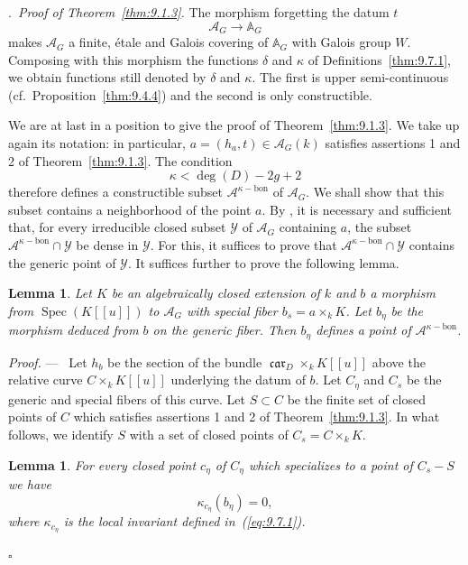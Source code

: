 \documentclass[12pt,a4paper,oneside,english,leqno]{smfart}
\makeatletter
\numberwithin{equation}{subsection}
\newcounter{theo}
\numberwithin{theo}{subsection}
\newenvironment{paragr}[1][]{\medskip\refstepcounter{subsection}%
  \par\noindent\hspace*{\parindent}\thesubsection.\ \emph{#1}%
  \@ifundefined{@empty}{}{}\ignorespaces}{\medskip}
\theoremstyle{plain}
\newtheorem{lemma}[theo]{Lemma}
\theoremstyle{definition}
\theoremstyle{remark}
\newenvironment{preuve}[1][]{\medskip\noindent\textit{Proof.} #1 ---\ }%
  {\hfill\ensuremath{\square}\medskip}
\DeclareMathOperator{\Spec}{Spec}
\DeclareMathOperator{\car}{\mathfrak{car}}
\newcommand{\AAA}{\mathbb{A}}
\newcommand{\yc}{\mathcal{Y}}
\newcommand{\Ac}{\mathcal{A}}
\makeatother
\begin{document}
\begin{paragr}[Proof of Theorem~\protect\ref{thm:9.1.3}.]\label{S:9.15}
The morphism forgetting the datum $t$
$$\Ac_G\to\AAA_G$$
makes $\Ac_G$ a finite, \'etale and Galois covering of $\AAA_G$ with Galois group $W$. Composing with this morphism the functions $\delta$ and $\kappa$ of Definitions~\ref{thm:9.7.1}, we obtain functions still denoted by $\delta$ and $\kappa$. The first is upper semi-continuous (cf.\ Proposition~\ref{thm:9.4.4}) and the second is only constructible.

We are at last in a position to give the proof of Theorem~\ref{thm:9.1.3}. We take up again its notation: in particular, $a=(h_a,t)\in\Ac_G(k)$ satisfies assertions 1 and 2 of Theorem~\ref{thm:9.1.3}. The condition
$$\kappa<\deg(D)-2g+2$$
therefore defines a constructible subset $\Ac^{\kappa-\mathrm{bon}}$ of $\Ac_G$. We shall show that this subset contains a neighborhood of the point $a$. By \cite[Chap.~0, Prop.~9.2.5]{EGAIII}, it is necessary and sufficient that, for every irreducible closed subset $\yc$ of $\Ac_G$ containing $a$, the subset $\Ac^{\kappa-\mathrm{bon}}\cap\yc$ be dense in $\yc$. For this, it suffices to prove that $\Ac^{\kappa-\mathrm{bon}}\cap\yc$ contains the generic point of $\yc$. It suffices further to prove the following lemma.

\begin{lemma}\label{thm:9.15.1}
Let $K$ be an algebraically closed extension of $k$ and $b$ a morphism from $\Spec(K[[u]])$ to $\Ac_G$ with special fiber $b_s=a\times_kK$. Let $b_\eta$ be the morphism deduced from $b$ on the generic fiber. Then $b_\eta$ defines a point of $\Ac^{\kappa-\mathrm{bon}}$.
\end{lemma}

\begin{preuve}
Let $h_b$ be the section of the bundle $\car_D\times_kK[[u]]$ above the relative curve $C\times_kK[[u]]$ underlying the datum of $b$. Let $C_\eta$ and $C_s$ be the generic and special fibers of this curve. Let $S\subset C$ be the finite set of closed points of $C$ which satisfies assertions 1 and 2 of Theorem~\ref{thm:9.1.3}. In what follows, we identify $S$ with a set of closed points of $C_s=C\times_kK$.

\begin{lemma}\label{thm:9.15.2}
For every closed point $c_\eta$ of $C_\eta$ which specializes to a point of $C_s-S$ we have
$$\kappa_{c_\eta}(b_\eta)=0,$$
where $\kappa_{c_\eta}$ is the local invariant defined in~(\ref{eq:9.7.1}).
\end{lemma}


\end{preuve}
\end{paragr}
\end{document}
